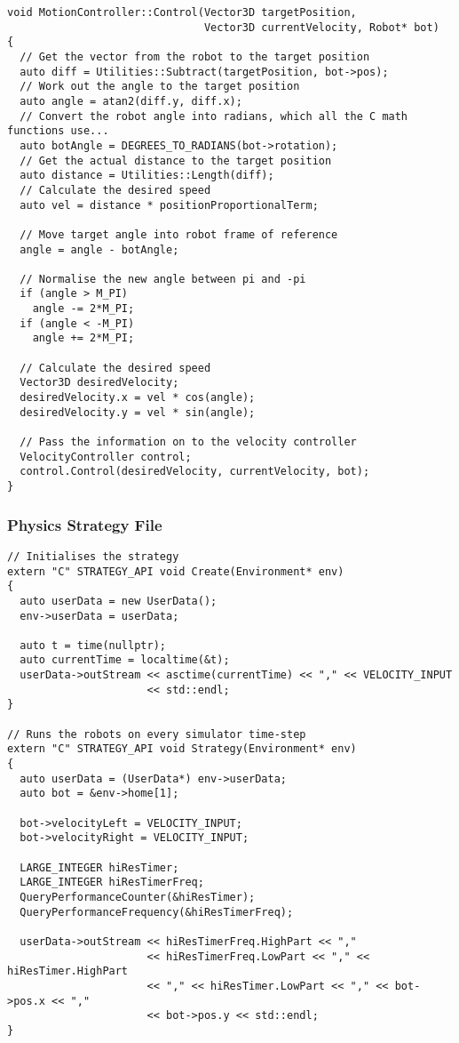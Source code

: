 \begin{lstlisting}
void MotionController::Control(Vector3D targetPosition, 
                               Vector3D currentVelocity, Robot* bot)
{
  // Get the vector from the robot to the target position
  auto diff = Utilities::Subtract(targetPosition, bot->pos); 
  // Work out the angle to the target position
  auto angle = atan2(diff.y, diff.x);                        
  // Convert the robot angle into radians, which all the C math functions use...
  auto botAngle = DEGREES_TO_RADIANS(bot->rotation);         
  // Get the actual distance to the target position
  auto distance = Utilities::Length(diff);                   
  // Calculate the desired speed
  auto vel = distance * positionProportionalTerm;            

  // Move target angle into robot frame of reference
  angle = angle - botAngle;                                  

  // Normalise the new angle between pi and -pi
  if (angle > M_PI)
    angle -= 2*M_PI;
  if (angle < -M_PI)
    angle += 2*M_PI;

  // Calculate the desired speed
  Vector3D desiredVelocity;                                  
  desiredVelocity.x = vel * cos(angle);                 
  desiredVelocity.y = vel * sin(angle);

  // Pass the information on to the velocity controller
  VelocityController control;                                
  control.Control(desiredVelocity, currentVelocity, bot);    
}
\end{lstlisting}

\subsubsection{Physics Strategy File\label{app:physicsStrategy}}

\begin{lstlisting}
// Initialises the strategy
extern "C" STRATEGY_API void Create(Environment* env)
{
  auto userData = new UserData();
  env->userData = userData;

  auto t = time(nullptr);
  auto currentTime = localtime(&t);
  userData->outStream << asctime(currentTime) << "," << VELOCITY_INPUT 
                      << std::endl;
}

// Runs the robots on every simulator time-step
extern "C" STRATEGY_API void Strategy(Environment* env)
{
  auto userData = (UserData*) env->userData;
  auto bot = &env->home[1];

  bot->velocityLeft = VELOCITY_INPUT;
  bot->velocityRight = VELOCITY_INPUT;

  LARGE_INTEGER hiResTimer;
  LARGE_INTEGER hiResTimerFreq;
  QueryPerformanceCounter(&hiResTimer);
  QueryPerformanceFrequency(&hiResTimerFreq);

  userData->outStream << hiResTimerFreq.HighPart << "," 
                      << hiResTimerFreq.LowPart << "," << hiResTimer.HighPart 
                      << "," << hiResTimer.LowPart << "," << bot->pos.x << "," 
                      << bot->pos.y << std::endl; 
}
\end{lstlisting}

\cleardoublepage{}


